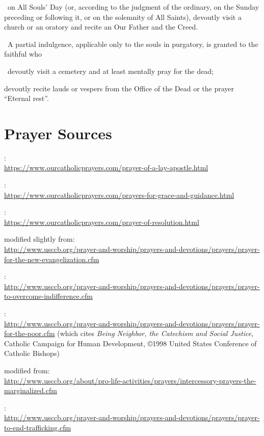 \documentclass[12pt]{article}
\begin{document}
 on All Souls' Day (or, according to the judgment of the ordinary, on the Sunday preceding or following it, or on the solemnity of All Saints), devoutly visit a church or an oratory and recite an Our Father and the Creed.

 A partial indulgence, applicable only to the souls in purgatory, is granted to the faithful who

 devoutly visit a cemetery and at least mentally pray for the dead;

 devoutly recite lauds or vespers from the Office of the Dead or the prayer ``Eternal rest''.

\newpage
\section{Prayer Sources}
\newcommand{\urlsource}[1]{:\\{\small\url{#1}}}

\urlsource{https://www.ourcatholicprayers.com/prayer-of-a-lay-apostle.html}

\urlsource{https://www.ourcatholicprayers.com/prayers-for-grace-and-guidance.html}

\urlsource{https://www.ourcatholicprayers.com/prayer-of-resolution.html}


 modified slightly from\urlsource{http://www.usccb.org/prayer-and-worship/prayers-and-devotions/prayers/prayer-for-the-new-evangelization.cfm}

\urlsource{http://www.usccb.org/prayer-and-worship/prayers-and-devotions/prayers/prayer-to-overcome-indifference.cfm}

\urlsource{http://www.usccb.org/prayer-and-worship/prayers-and-devotions/prayers/prayer-for-the-poor.cfm} (which cites \textit{Being Neighbor, the Catechism and Social Justice}, Catholic Campaign for Human Development, ©1998 United States Conference of Catholic Bishops)

 modified from\urlsource{http://www.usccb.org/about/pro-life-activities/prayers/intercessory-prayers-the-marginalized.cfm}

\urlsource{http://www.usccb.org/prayer-and-worship/prayers-and-devotions/prayers/prayer-to-end-trafficking.cfm}
\end{document}
